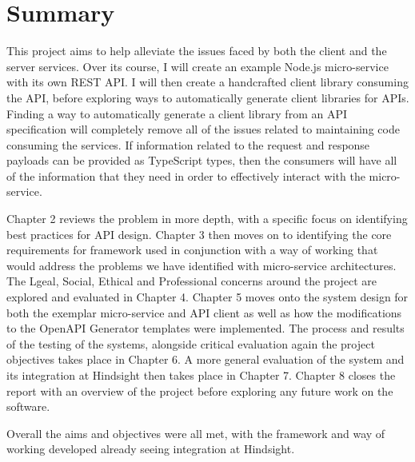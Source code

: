  \section{Summary}
 
 This project aims to help alleviate the issues faced by both the client and the server services. Over its course, I will create an example Node.js micro-service with its own REST API. I will then create a handcrafted client library consuming the API, before exploring ways to automatically generate client libraries for APIs. Finding a way to automatically generate a client library from an API specification will completely remove all of the issues related to maintaining code consuming the services. If information related to the request and response payloads can be provided as TypeScript types, then the consumers will have all of the information that they need in order to effectively interact with the micro-service.
 
 Chapter 2 reviews the problem in more depth, with a specific focus on identifying best practices for API design. Chapter 3 then moves on to identifying the core requirements for framework used in conjunction with a way of working that would address the problems we have identified with micro-service architectures. The Lgeal, Social, Ethical and Professional concerns around the project are explored and evaluated in Chapter 4. Chapter 5 moves onto the system design for both the exemplar micro-service and API client as well as how the modifications to the OpenAPI Generator templates were implemented. The process and results of the testing of the systems, alongside critical evaluation again the project objectives takes place in Chapter 6. A more general evaluation of the system and its integration at Hindsight then takes place in Chapter 7. Chapter 8 closes the report with an overview of the project before exploring any future work on the software.
 
 Overall the aims and objectives were all met, with the framework and way of working developed already seeing integration at Hindsight.